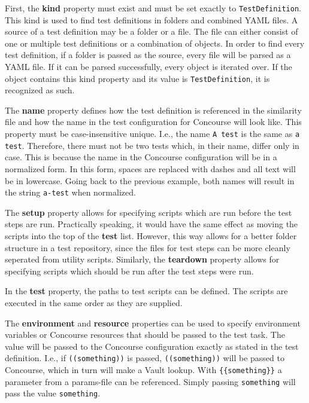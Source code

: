 First, the \textbf{kind} property must exist and must be set exactly to \verb|TestDefinition|.
This kind is used to find test definitions in folders and combined YAML files.
A source of a test definition may be a folder or a file.
The file can either consist of one or multiple test definitions or a combination of objects.
In order to find every test definition, if a folder is passed as the source, every file will be parsed as a YAML file.
If it can be parsed successfully, every object is iterated over.
If the object contains this kind property and its value is \verb|TestDefinition|, it is recognized as such.

The \textbf{name} property defines how the test definition is referenced in the similarity file and how the name in the test configuration for Concourse will look like.
This property must be case-insensitive unique.
I.e., the name \verb|A test| is the same as \verb|a test|.
Therefore, there must not be two tests which, in their name, differ only in case.
This is because the name in the Concourse configuration will be in a normalized form.
In this form, spaces are replaced with dashes and all text will be in lowercase.
Going back to the previous example, both names will result in the string \verb|a-test| when normalized.

The \textbf{setup} property allows for specifying scripts which are run before the test steps are run.
Practically speaking, it would have the same effect as moving the scripts into the top of the \textbf{test} list.
However, this way allows for a better folder structure in a test repository, since the files for test steps can be more cleanly seperated from utility scripts.
Similarly, the \textbf{teardown} property allows for specifying scripts which should be run after the test steps were run.

In the \textbf{test} property, the paths to test scripts can be defined.
The scripts are executed in the same order as they are supplied.

The \textbf{environment} and \textbf{resource} properties can be used to specify environment variables or Concourse resources that should be passed to the test task.
The value will be passed to the Concourse configuration exactly as stated in the test definition.
I.e., if \verb|((something))| is passed, \verb|((something))| will be passed to Concourse, which in turn will make a Vault lookup.
With \verb|{{something}}| a parameter from a params-file can be referenced.
Simply passing \verb|something| will pass the value \verb|something|.

